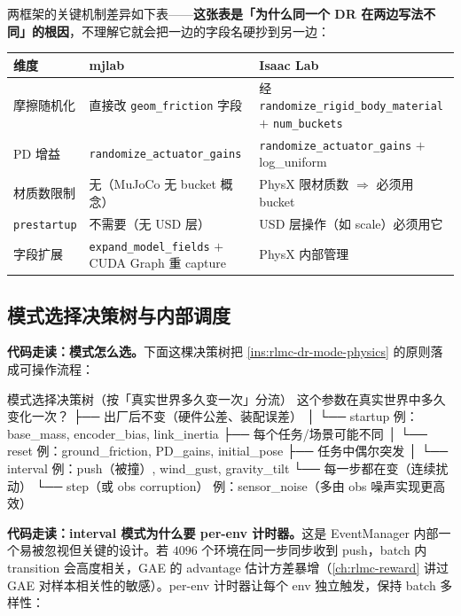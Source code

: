 两框架的关键机制差异如下表——\textbf{这张表是「为什么同一个 DR 在两边写法不同」的根因}，不理解它就会把一边的字段名硬抄到另一边：

\begin{center}
\small
\begin{tabular}{@{}lll@{}}
\toprule
维度 & mjlab & Isaac Lab \\
\midrule
摩擦随机化 & 直接改 \verb|geom_friction| 字段 & 经 \verb|randomize_rigid_body_material| $+$ \verb|num_buckets| \\
PD 增益 & \verb|randomize_actuator_gains| & \verb|randomize_actuator_gains| $+$ log\_uniform \\
材质数限制 & 无（MuJoCo 无 bucket 概念） & PhysX 限材质数 $\Rightarrow$ 必须用 bucket \\
\verb|prestartup| & 不需要（无 USD 层） & USD 层操作（如 scale）必须用它 \\
字段扩展 & \verb|expand_model_fields| $+$ CUDA Graph 重 capture & PhysX 内部管理 \\
\bottomrule
\end{tabular}
\end{center}

\subsection{模式选择决策树与内部调度}
\label{sec:rlmc-dr-mode-tree}

\textbf{代码走读：模式怎么选。}下面这棵决策树把 \cref{ins:rlmc-dr-mode-physics} 的原则落成可操作流程：

\begin{codebox}{模式选择决策树（按「真实世界多久变一次」分流）}
这个参数在真实世界中多久变化一次？
├── 出厂后不变（硬件公差、装配误差）
│   └── startup        例：base_mass, encoder_bias, link_inertia
├── 每个任务/场景可能不同
│   └── reset          例：ground_friction, PD_gains, initial_pose
├── 任务中偶尔突发
│   └── interval       例：push（被撞）, wind_gust, gravity_tilt
└── 每一步都在变（连续扰动）
    └── step（或 obs corruption）  例：sensor_noise（多由 obs 噪声实现更高效）
\end{codebox}

\textbf{代码走读：interval 模式为什么要 per-env 计时器。}这是 EventManager 内部一个易被忽视但关键的设计。若 $4096$ 个环境在同一步同步收到 push，batch 内 transition 会高度相关，GAE 的 advantage 估计方差暴增（\cref{ch:rlmc-reward} 讲过 GAE 对样本相关性的敏感）。per-env 计时器让每个 env 独立触发，保持 batch 多样性：

